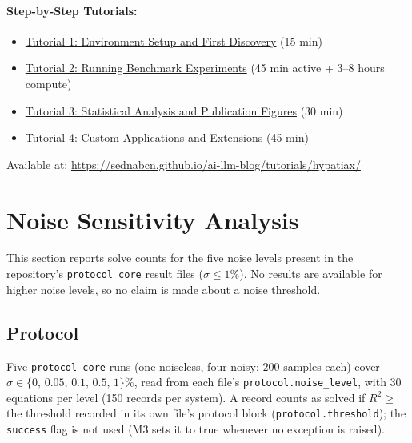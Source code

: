 \documentclass[twoside,11pt]{article}
\newcommand{\Rsq}{R^{2}}
\begin{document}
\paragraph{Step-by-Step Tutorials:}
\begin{itemize}
\item \href{https://sednabcn.github.io/ai-llm-blog/tutorials/hypatiax/setup/}{Tutorial 1: Environment Setup and First Discovery} (15 min)
\item \href{https://sednabcn.github.io/ai-llm-blog/tutorials/hypatiax/experiments/}{Tutorial 2: Running Benchmark Experiments} (45 min active + 3--8 hours compute)
\item \href{https://sednabcn.github.io/ai-llm-blog/tutorials/hypatiax/analysis/}{Tutorial 3: Statistical Analysis and Publication Figures} (30 min)
\item \href{https://sednabcn.github.io/ai-llm-blog/tutorials/hypatiax/extensions/}{Tutorial 4: Custom Applications and Extensions} (45 min)
\end{itemize}
Available at: \url{https://sednabcn.github.io/ai-llm-blog/tutorials/hypatiax/}




\section{Noise Sensitivity Analysis}
\label{app:noise_sensitivity}

This section reports solve counts for the five noise levels present in the
repository's \texttt{protocol\_core} result files ($\sigma\leq1\%$). No results are available for higher noise levels, so no claim is made about a noise threshold.

\subsection{Protocol}

Five \texttt{protocol\_core} runs (one noiseless, four noisy; $200$ samples each)
cover $\sigma\in\{0,\,0.05,\,0.1,\,0.5,\,1\}\%$, read from each file's
\texttt{protocol.noise\_level}, with 30 equations per level (150 records per
system). A record counts as solved if $\Rsq\geq$ the threshold recorded in its
own file's protocol block (\texttt{protocol.threshold}); the
\texttt{success} flag is not used (M3 sets it to true whenever no exception is
raised).
\end{document}
